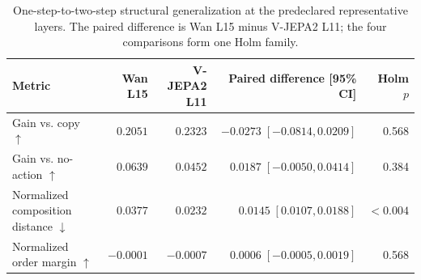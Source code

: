 \begin{table}[t]
\centering
\small
\caption{One-step-to-two-step structural generalization at the predeclared representative layers. The paired difference is Wan L15 minus V-JEPA2 L11; the four comparisons form one Holm family.}
\label{tab:se3_representative}
\setlength{\tabcolsep}{4pt}
\begin{tabular}{lrrrr}
\toprule
Metric & Wan L15 & V-JEPA2 L11 & Paired difference [95\% CI] & Holm $p$ \\
\midrule
Gain vs. copy $\uparrow$ & $0.2051$ & $0.2323$ & $-0.0273\;[-0.0814, 0.0209]$ & 0.568 \\
Gain vs. no-action $\uparrow$ & $0.0639$ & $0.0452$ & $0.0187\;[-0.0050, 0.0414]$ & 0.384 \\
Normalized composition distance $\downarrow$ & $0.0377$ & $0.0232$ & $0.0145\;[0.0107, 0.0188]$ & $<0.004$ \\
Normalized order margin $\uparrow$ & $-0.0001$ & $-0.0007$ & $0.0006\;[-0.0005, 0.0019]$ & 0.568 \\
\bottomrule
\end{tabular}
\end{table}
